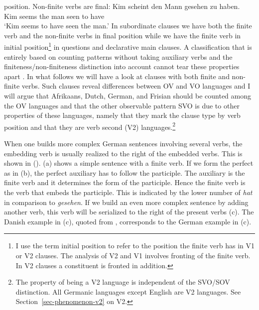 position. Non-finite verbs are final: 
\ea
\gll Kim scheint den Mann gesehen zu haben.\\
     Kim seems   the man  seen to have\\
\glt `Kim seems to have seen the man.'
\z
In subordinate clauses we have both the finite verb and the non-finite verbs in final position while
we have the finite verb in initial position\footnote{%
  I use the term initial position to refer to the position the finite verb has in V1 or V2 clauses. The
  analysis of V2 and V1 involves fronting of the finite verb. In V2 clauses a constituent is fronted
  in addition.
} in questions and declarative main clauses.
A classification that is entirely based on counting patterns without taking auxiliary verbs and the
finiteness/non-finiteness distinction into account cannot tear these properties apart \citep[Section~3]{Hoehle83a}. In what follows we will have a look at clauses with
both finite and non-finite verbs. Such clauses reveal differences between OV and VO languages and I will argue that Afrikaans, Dutch,
German, and Frisian should be counted among the OV languages and that the other observable pattern
SVO is due to other properties of these languages, namely that they mark the clause type by verb
position and that they are verb second (V2) languages.\footnote{%
  The property of being a V2 language is independent of the SVO/SOV distinction. All Germanic
  languages except English are V2 languages. See Section~\ref{sec-phenomenon-v2} on V2.
}

When one builds more complex German sentences involving several verbs, the embedding verb is usually
realized to the right of the embedded verbs. This is shown in (). (a) shows a simple
sentence with a finite verb. If we form the perfect as in (b), the perfect auxiliary has to
follow the participle. The auxiliary is the finite verb and it determines the form of the
participle. Hence the finite verb is the verb that embeds the participle. This is indicated by the
lower number of \emph{hat} in comparison to \emph{gesehen}. If we build an even more complex
sentence by adding another verb, this verb will be serialized to the right of the present verbs
(c).  The Danish example in (c), quoted from \citet[]{Oersnes2009b}, corresponds to the
German example in (c).

